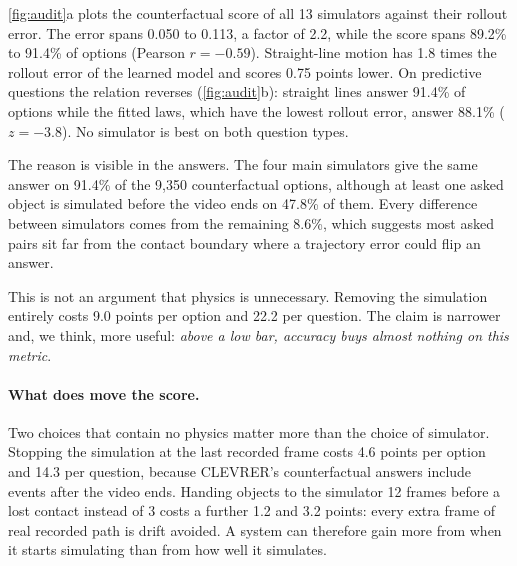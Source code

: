 \documentclass[10pt,letterpaper]{article}
\begin{document}
\cref{fig:audit}a plots the counterfactual score of all 13 simulators against their rollout
error. The error spans 0.050 to 0.113, a factor of 2.2, while the score spans 89.2\% to
91.4\% of options (Pearson $r=-0.59$). Straight-line motion has 1.8 times the rollout error
of the learned model and scores 0.75 points lower. On predictive questions the relation
reverses (\cref{fig:audit}b): straight lines answer 91.4\% of options while the fitted laws,
which have the lowest rollout error, answer 88.1\% ($z=-3.8$). No simulator is best on both
question types.

The reason is visible in the answers. The four main simulators give the same answer on
91.4\% of the 9,350 counterfactual options, although at least one asked object is simulated
before the video ends on 47.8\% of them. Every difference between simulators comes from the
remaining 8.6\%, which suggests most asked pairs sit far from the contact boundary where a
trajectory error could flip an answer.

This is not an argument that physics is unnecessary. Removing the simulation entirely costs
9.0 points per option and 22.2 per question. The claim is narrower and, we think, more
useful: \emph{above a low bar, accuracy buys almost nothing on this metric}.

\paragraph{What does move the score.} Two choices that contain no physics matter more than
the choice of simulator. Stopping the simulation at the last recorded frame costs 4.6 points
per option and 14.3 per question, because CLEVRER's counterfactual answers include events
after the video ends. Handing objects to the simulator 12 frames before a lost contact
instead of 3 costs a further 1.2 and 3.2 points: every extra frame of real recorded path is
drift avoided. A system can therefore gain more from when it starts simulating than from how
well it simulates.
\end{document}
